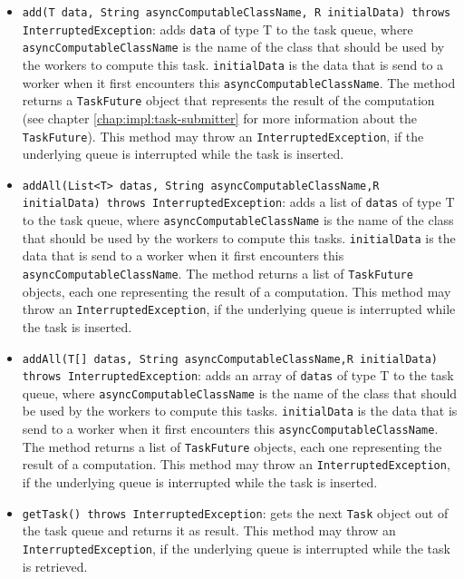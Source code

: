   \begin{itemize}
    \item \texttt{add(T data, String asyncComputableClassName, R initialData) throws InterruptedException}: adds \texttt{data} of type T to the task queue, where \texttt{asyncComputableClassName} is the name of the class that should be used by the workers to compute this task. \texttt{initialData} is the data that is send to a worker when it first encounters this \texttt{asyncComputableClassName}. The method returns a \texttt{TaskFuture} object that represents the result of the computation (see chapter \ref{chap:impl:task-submitter} for more information about the \texttt{TaskFuture}). This method may throw an \texttt{InterruptedException}, if the underlying queue is interrupted while the task is inserted.
    \item \texttt{addAll(List<T> datas, String asyncComputableClassName,\newline R initialData) throws InterruptedException}: adds a list of \texttt{datas} of type T to the task queue, where \texttt{asyncComputableClassName} is the name of the class that should be used by the workers to compute this tasks. \texttt{initialData} is the data that is send to a worker when it first encounters this \texttt{asyncComputableClassName}. The method returns a list of \texttt{TaskFuture} objects, each one representing the result of a computation. This method may throw an \texttt{InterruptedException}, if the underlying queue is interrupted while the task is inserted.
    \item \texttt{addAll(T[] datas, String asyncComputableClassName,\newline R initialData) throws InterruptedException}:  adds an array of \texttt{datas} of type T to the task queue, where \texttt{asyncComputableClassName} is the name of the class that should be used by the workers to compute this tasks. \texttt{initialData} is the data that is send to a worker when it first encounters this \texttt{asyncComputableClassName}. The method returns a list of \texttt{TaskFuture} objects, each one representing the result of a computation. This method may throw an \texttt{InterruptedException}, if the underlying queue is interrupted while the task is inserted.
    \item \texttt{getTask() throws InterruptedException}: gets the next \texttt{Task} object out of the task queue and returns it as result. This method may throw an \texttt{InterruptedException}, if the underlying queue is interrupted while the task is retrieved.

\end{itemize}
